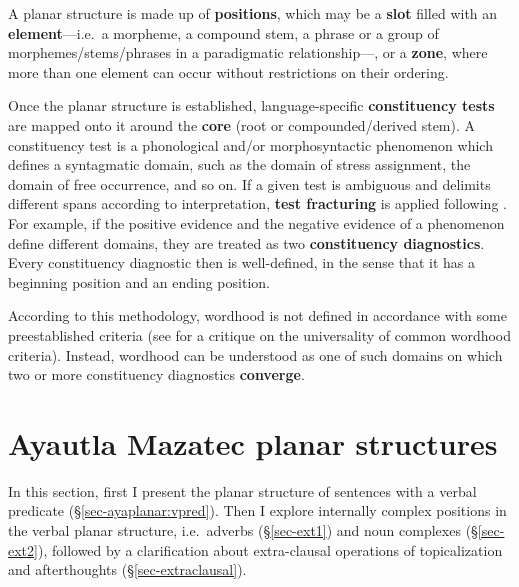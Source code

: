 \documentclass[output=paper]{langscibook}
\begin{document}
A planar structure is made up of \textbf{positions}, which may be a \textbf{slot} filled with an \textbf{element}—i.e.~a morpheme, a compound stem, a phrase or a group of morphemes/stems/phrases in a paradigmatic relationship—, or a \textbf{zone}, where more than one element can occur without restrictions on their ordering.


Once the planar structure is established, language-specific \textbf{constituency tests} are mapped onto it around the \textbf{core} (root or compounded/derived stem). A constituency test is a phonological and/or morphosyntactic phenomenon which defines a syntagmatic domain, such as the domain of stress assignment, the domain of free occurrence, and so on.
If a given test is ambiguous and delimits different spans according to interpretation, \textbf{test fracturing} is applied following \citet{tallman2021constituency}. For example, if the positive evidence and the negative evidence of a phenomenon define different domains, they are treated as two \textbf{constituency diagnostics}.
Every constituency diagnostic then is well-defined, in the sense that it has a beginning position and an ending position.

According to this methodology, wordhood is not defined in accordance with some preestablished criteria (see \citealt{haspelmathword:2011} for a critique on the universality of common wordhood criteria). Instead, wordhood can be understood as one of such domains on which two or more constituency diagnostics \textbf{converge}.


\section{Ayautla Mazatec planar structures}\label{sec-ayaplanar}
In this section, first I present the planar structure of sentences with a verbal predicate (\S\ref{sec-ayaplanar:vpred}). Then I explore internally complex positions in the verbal planar structure, i.e.~adverbs (\S\ref{sec-ext1}) and noun complexes (\S\ref{sec-ext2}), followed by a clarification about extra-clausal operations of topicalization and afterthoughts  (\S\ref{sec-extraclausal}).
\end{document}

